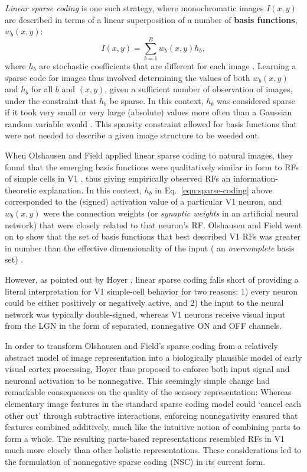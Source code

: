 \emph{Linear sparse coding} is one such strategy,
where monochromatic images $I(x,y)$
are described in terms of a linear superposition of
a number of \textbf{basis functions},
$w_b(x,y)$:
\begin{equation}
I(x,y) = \sum^B_{b=1} w_b(x,y) h_b,
\label{eqn:sparse-coding}
\end{equation}
where $h_b$ are stochastic coefficients that are different for each image
\cite{OlshausenField1996,Hyvarinen2001}.
Learning a sparse code for images thus involved determining
the values of both $w_b(x,y)$ and $h_b$ for all $b$ and $(x,y)$,
given a sufficient number of observation of images,
under the constraint that $h_b$ be sparse.
In this context, $h_b$ was considered sparse if it took very small
or very large (absolute) values more often than a Gaussian random
variable would \cite{Hyvarinen2001}.
This sparsity constraint allowed for basis functions that were not
needed to describe a given image structure to be weeded out.

When Olshausen and Field applied linear sparse coding 
to natural images,
they found that the emerging basis functions 
were qualitatively similar in form
to \acp{RF} of simple cells in \ac{V1} 
\cite{OlshausenField1996,OlshausenField1997},
thus giving empirically observed \acp{RF} 
an information-theoretic explanation.
In this context, $h_b$ in Eq.~\ref{eqn:sparse-coding} above
corresponded to the (signed) activation value of a particular \ac{V1}
neuron, and $w_b(x,y)$ were the connection weights
(or \emph{synaptic weights} in an artificial neural network)
that were closely related to that neuron's \ac{RF}.
Olshausen and Field went on to show that 
the set of basis functions that best described \ac{V1} \acp{RF} 
was greater in number than the effective
dimensionality of the input
( an \emph{overcomplete} basis set) 
\cite{OlshausenField1997}.

However, as pointed out by Hoyer \cite{Hoyer2003}, 
linear sparse coding falls short of providing a literal interpretation
for \ac{V1} simple-cell behavior for two reasons:
1) every neuron could be either positively or negatively active, and
2) the input to the neural network was typically double-signed,
whereas \ac{V1} neurons receive visual input from the \ac{LGN} 
in the form of separated, nonnegative ON and OFF channels.

In order to transform Olshausen and Field's sparse coding
from a relatively abstract model of image representation 
into a biologically plausible model of early visual cortex processing,
Hoyer \cite{Hoyer2002,Hoyer2003} thus proposed to enforce
both input signal and neuronal activation to be nonnegative.
This seemingly simple change had remarkable consequences 
on the quality of the sensory representation:
Whereas elementary image features in the standard sparse coding model
could `cancel each other out' through subtractive interactions,
enforcing nonnegativity ensured that features combined additively,
much like the intuitive notion of combining parts to form a whole.
The resulting parts-based representations resembled \acp{RF} in \ac{V1} 
much more closely than other holistic representations.
These considerations led to the formulation of nonnegative sparse coding (\ac{NSC}) in its current form.


